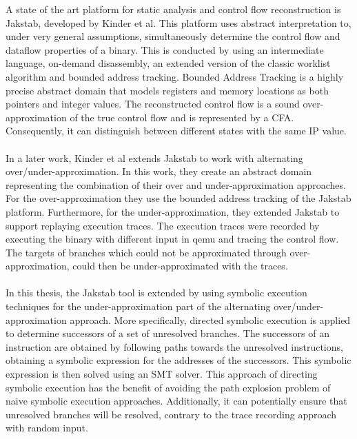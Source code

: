 \documentclass{kththesis}
\begin{document}
A state of the art platform for static analysis and control flow reconstruction is Jakstab\cite{JakstabGit}, developed by Kinder et al\cite{Jakstab}. This platform uses abstract interpretation to, under very general assumptions, simultaneously determine the control flow and dataflow properties of a binary. This is conducted by using an intermediate language, on-demand disassembly, an extended version of the classic worklist algorithm and bounded address tracking. Bounded Address Tracking is a highly precise abstract domain that models registers and memory locations as both pointers and integer values. The reconstructed control flow is a sound over-approximation of the true control flow and is represented by a CFA. Consequently, it can distinguish between different states with the same IP value.
\\ \\
In a later work, Kinder et al extends Jakstab to work with alternating over/under-approximation\cite{alternating}. In this work, they create an abstract domain representing the combination of their over and under-approximation approaches. For the over-approximation they use the bounded address tracking of the Jakstab platform. Furthermore, for the under-approximation, they extended Jakstab to support replaying execution traces. The execution traces were recorded by executing the binary with different input in qemu and tracing the control flow. The targets of branches which could not be approximated through over-approximation, could then be under-approximated with the traces. 
\\ \\
In this thesis, the Jakstab tool is extended by using symbolic execution techniques for the under-approximation part of the alternating over/under-approximation approach. More specifically, directed symbolic execution is applied to determine successors of a set of unresolved branches. The successors of an instruction are obtained by following paths towards the unresolved instructions, obtaining a symbolic expression for the addresses of the successors. This symbolic expression is then solved using an SMT solver. This approach of directing symbolic execution has the benefit of avoiding the path explosion problem of naive symbolic execution approaches. Additionally, it can potentially ensure that unresolved branches will be resolved, contrary to the trace recording approach with random input.
\end{document}

